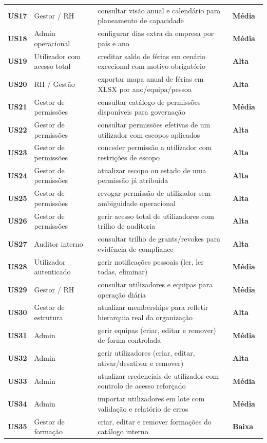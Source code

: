 \documentclass[11pt,a4paper,twoside]{article}
\newcommand{\taghi}  {{\setlength{\fboxsep}{1.5pt}\colorbox{TAGHI}  {\scriptsize\sffamily\bfseries\color{white}~Alta~}}}
\newcommand{\tagmed} {{\setlength{\fboxsep}{1.5pt}\colorbox{TAGMED} {\scriptsize\sffamily\bfseries\color{white}~Média~}}}
\newcommand{\taglo}  {{\setlength{\fboxsep}{1.5pt}\colorbox{TAGLO}  {\scriptsize\sffamily\bfseries\color{white}~Baixa~}}}
\begin{document}
\begin{longtable}{>{\small\centering\arraybackslash\bfseries}p{1.0cm} >{\small}p{4.4cm} >{\small}p{6.8cm} >{\small\centering\arraybackslash}p{1.4cm}}
US17 & Gestor / RH & consultar visão anual e calendário para planeamento de capacidade & \tagmed \\
US18 & Admin operacional & configurar dias extra da empresa por país e ano & \tagmed \\
US19 & Utilizador com acesso total & creditar saldo de férias em cenário excecional com motivo obrigatório & \taghi \\
US20 & RH / Gestão & exportar mapa anual de férias em XLSX por ano/equipa/pessoa & \taghi \\
US21 & Gestor de permissões & consultar catálogo de permissões disponíveis para governação & \tagmed \\
US22 & Gestor de permissões & consultar permissões efetivas de um utilizador com escopos aplicados & \taghi \\
US23 & Gestor de permissões & conceder permissão a utilizador com restrições de escopo & \taghi \\
US24 & Gestor de permissões & atualizar escopo ou estado de uma permissão já atribuída & \taghi \\
US25 & Gestor de permissões & revogar permissão de utilizador sem ambiguidade operacional & \taghi \\
US26 & Gestor de permissões & gerir acesso total de utilizadores com trilho de auditoria & \taghi \\
US27 & Auditor interno & consultar trilho de grants/revokes para evidência de compliance & \taghi \\
US28 & Utilizador autenticado & gerir notificações pessoais (ler, ler todas, eliminar) & \tagmed \\
US29 & Gestor / RH & consultar utilizadores e equipas para operação diária & \tagmed \\
US30 & Gestor de estrutura & atualizar memberships para refletir hierarquia real da organização & \taghi \\
US31 & Admin & gerir equipas (criar, editar e remover) de forma controlada & \tagmed \\
US32 & Admin & gerir utilizadores (criar, editar, ativar/desativar e remover) & \taghi \\
US33 & Admin & atualizar credenciais de utilizador com controlo de acesso reforçado & \tagmed \\
US34 & Admin & importar utilizadores em lote com validação e relatório de erros & \tagmed \\
US35 & Gestor de formação & criar, editar e remover formações do catálogo interno & \taglo \\

\end{longtable}
\end{document}
